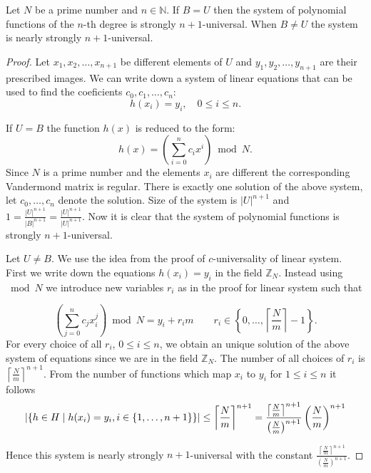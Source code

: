 \begin{remark}
Let $N$ be a prime number and $n \in \mathbb{N}$. If $B = U$ then the system of polynomial functions of the $n$-th degree is strongly $n + 1$-universal. When $B \neq U$ the system is nearly strongly $n + 1$-universal.
\end{remark}
\begin{proof}
Let $x_1, x_2, \dots, x_{n+1}$ be different elements of $U$ and $y_1, y_2, \dots, y_{n+1}$ are their prescribed images. We can write down a system of linear equations that can be used to find the coeficients $c_0, c_1, \dots, c_n$:
\[ 
h(x_i) = y_i, \quad 0 \leq i \leq n \text{.}
\]

If $U = B$ the function $h(x)$ is reduced to the form: \[ h(x) = \left( \displaystyle \sum_{i=0}^{n} c_i x^i \right) \bmod N \text{.} \] Since $N$ is a prime number and the elements $x_i$ are different the corresponding Vandermond matrix is regular. There is exactly one solution of the above system, let $c_0, \dots, c_n$ denote the solution. Size of the system is ${|U|}^{n+1}$ and $1 = \frac{|U| ^ {n + 1}}{|B|^{n + 1}} = \frac{|U| ^ {n + 1}}{|U|^{n + 1}}$. Now it is clear that the system of polynomial functions is strongly $n + 1$-universal.

Let $U \neq B$. We use the idea from the proof of $c$-universality of linear system. First we write down the equations $h(x_i) = y_i$ in the field $\mathbb{Z}_N$. Instead using $\bmod N$ we introduce new variables $r_i$ as in the proof for linear system such that

\begin{displaymath}
\left(\displaystyle \sum_{j=0}^{n} c_j x_{i}^{j} \right) \bmod N = {y}_i + {r_i}{m} \qquad r_i \in \left\{0, \dots, \left\lceil \frac{N}{m} \right\rceil - 1 \right\} \text{.}
\end{displaymath}
For every choice of all $r_i$, $0 \leq i \leq n$, we obtain an unique solution of the above system of equations since we are in the field $\mathbb{Z}_N$. The number of all choices of $r_i$ is ${\left\lceil \frac{N}{m} \right\rceil}^{n + 1}$. From the number of functions which map $x_i$ to $y_i$ for $1 \leq i \leq n$ it follows
\begin{displaymath}
|\{h \in H \mid h(x_i) = y_i, i \in \{1, \dots, n + 1\}\}| \leq {\left\lceil \frac{N}{m} \right\rceil}^{n + 1} = \frac{{\left\lceil \frac{N}{m} \right\rceil}^{n + 1}}{\left(\frac{N}{m}\right)^{n + 1}}\left(\frac{N}{m}\right)^{n+1}
\end{displaymath}

Hence this system is nearly strongly $n+1$-universal with the constant $\frac{{\left\lceil \frac{N}{m} \right\rceil}^{n + 1}}{\left(\frac{N}{m}\right)^{n+1}}$.
\end{proof}

